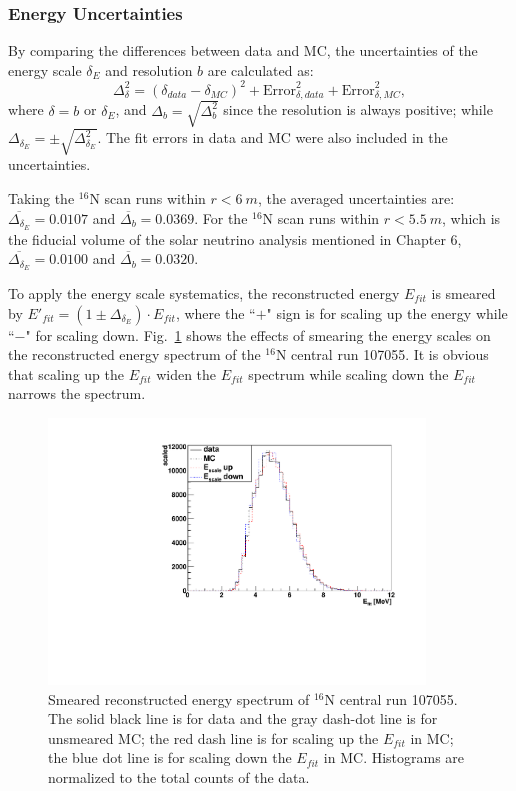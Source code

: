 \subsubsection{Energy Uncertainties}\label{sect:eneryUncertianties}
By comparing the differences between data and MC, the uncertainties of the energy scale $\delta_E$ and resolution $b$ are calculated as:
\begin{equation}
\Delta^2_{\delta}= (\delta_{data}-\delta_{MC})^2+\mathrm{Error}^2_{\delta,data}+\mathrm{Error}^2_{\delta,MC},
\end{equation}
where $\delta=b$ or $\delta_E$, and $\Delta_b=\sqrt{\Delta^2_{b}}$ since the resolution is always positive; while $\Delta_{\delta_E}=\pm\sqrt{\Delta^2_{\delta_E}}$. The fit errors in data and MC were also included in the uncertainties.

Taking the $^{16}$N scan runs within $r<6~m$, the averaged uncertainties are: $\overline{\Delta_{\delta_E}}=0.0107$ and $\overline{\Delta_{b}}=0.0369$. For the $^{16}$N scan runs within $r<5.5~m$, which is the fiducial volume of the solar neutrino analysis mentioned in Chapter 6, $\overline{\Delta_{\delta_E}}=0.0100$ and $\overline{\Delta_{b}}=0.0320$.

To apply the energy scale systematics, the reconstructed energy $E_{fit}$ is smeared by $E'_{fit}=(1\pm\Delta_{\delta_E})\cdot E_{fit}$, where the ``$+$" sign is for scaling up the energy while ``$-$" for scaling down. Fig.~\ref{fig:EscaleSmear} shows the effects of smearing the energy scales on the reconstructed energy spectrum of the $^{16}$N central run 107055. It is obvious that scaling up the $E_{fit}$ widen the $E_{fit}$ spectrum while scaling down the $E_{fit}$ narrows the spectrum. 
\begin{figure}
	\centering
	\includegraphics[width=10cm]{SmearedEscale_N16.pdf}
	\caption[Smeared reconstructed energy spectrum of $^{16}$N central run 107055.]{Smeared reconstructed energy spectrum of $^{16}$N central run 107055. The solid black line is for data and the gray dash-dot line is for unsmeared MC; the red dash line is for scaling up the $E_{fit}$ in MC; the blue dot line is for scaling down the $E_{fit}$ in MC. Histograms are normalized to the total counts of the data.}
	\label{fig:EscaleSmear}
\end{figure}

